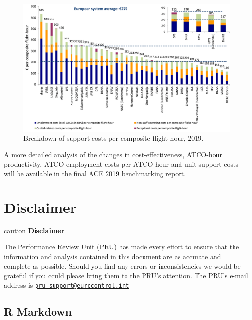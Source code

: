 \documentclass[
]{book}
\begin{document}
\begin{figure}

{\centering \includegraphics[width=1\linewidth]{figures/Figure 4-7} 

}

\caption{Breakdown of support costs per composite flight-hour, 2019.}\label{fig:figure17}
\end{figure}

A more detailed analysis of the changes in cost-effectiveness, ATCO-hour productivity, ATCO employment costs per ATCO-hour and unit support costs will be available in the final ACE 2019 benchmarking report.

\hypertarget{disclaimer}{%
\chapter*{Disclaimer}\label{disclaimer}}

\begin{infobox}{caution}
\textbf{Disclaimer}

The Performance Review Unit (PRU) has made every effort to ensure that the information and analysis contained in this document are as accurate and complete as possible. Should you find any errors or inconsistencies we would be grateful if you could please bring them to the PRU's attention. The PRU's e-mail address is \href{mailto:pru-support@eurocontrol.int}{\nolinkurl{pru-support@eurocontrol.int}}

\end{infobox}

\hypertarget{r-markdown}{%
\section{R Markdown}\label{r-markdown}}
\end{document}

